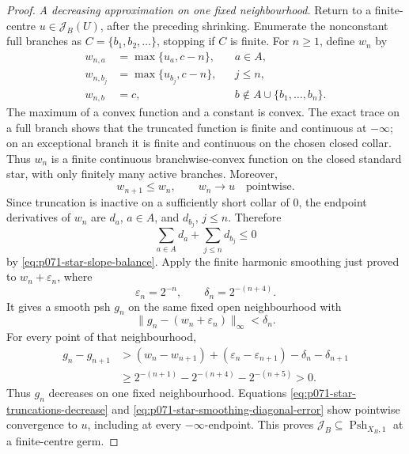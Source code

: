 \begin{proof}
\medskip\noindent
\emph{A decreasing approximation on one fixed neighbourhood.}
Return to a finite-centre \(u\in\mathscr J_B(U)\), after the preceding
shrinking.  Enumerate the nonconstant full branches as
\(C=\{b_1,b_2,\ldots\}\), stopping if \(C\) is finite.  For \(n\geq1\),
define \(w_n\) by
\begin{align}
 w_{n,a}&=\max\{u_a,c-n\}, &&a\in A,                 \label{eq:p071-star-truncation-a}\\
 w_{n,b_j}&=\max\{u_{b_j},c-n\}, &&j\leq n,          \label{eq:p071-star-truncation-b}\\
 w_{n,b}&=c, &&b\notin A\cup\{b_1,\ldots,b_n\}.     \label{eq:p071-star-truncation-inactive}
\end{align}
The maximum of a convex function and a constant is convex.  The exact
trace on a full branch shows that the truncated function is finite and
continuous at \(-\infty\); on an exceptional branch it is finite and
continuous on the chosen closed collar.  Thus \(w_n\) is a finite
continuous branchwise-convex function on the closed standard star, with
only finitely many active branches.  Moreover,
\begin{equation}
                        w_{n+1}\leq w_n,
                        \qquad w_n\longrightarrow u
                        \quad\text{pointwise}.
 \label{eq:p071-star-truncations-decrease}
\end{equation}
Since truncation is inactive on a sufficiently short collar of \(0\),
the endpoint derivatives of \(w_n\) are \(d_a\), \(a\in A\), and
\(d_{b_j}\), \(j\leq n\).  Therefore
\[
             \sum_{a\in A}d_a+\sum_{j\leq n}d_{b_j}\leq0
\]
by \eqref{eq:p071-star-slope-balance}.  Apply the finite harmonic
smoothing just proved to \(w_n+\varepsilon_n\), where
\[
                \varepsilon_n=2^{-n},
                \qquad \delta_n=2^{-(n+4)}.
\]
It gives a smooth psh \(g_n\) on the same fixed open neighbourhood with
\begin{equation}
                  \lVert g_n-(w_n+\varepsilon_n)\rVert_\infty
                         <\delta_n.
 \label{eq:p071-star-smoothing-diagonal-error}
\end{equation}
For every point of that neighbourhood,
\begin{align*}
 g_n-g_{n+1}
 &> (w_n-w_{n+1})+(\varepsilon_n-\varepsilon_{n+1})
            -\delta_n-\delta_{n+1}\\
 &\geq 2^{-(n+1)}-2^{-(n+4)}-2^{-(n+5)}>0.
\end{align*}
Thus \(g_n\) decreases on one fixed neighbourhood.  Equations
\eqref{eq:p071-star-truncations-decrease} and
\eqref{eq:p071-star-smoothing-diagonal-error} show pointwise convergence
to \(u\), including at every \(-\infty\)-endpoint.  This proves
\(\mathscr J_B\subseteq\operatorname{Psh}_{X_B,1}\) at a finite-centre
germ.


\end{proof}

